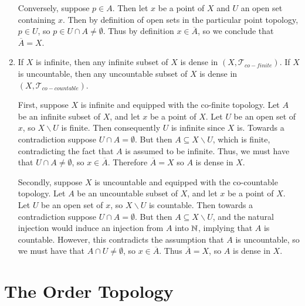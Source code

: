 \documentclass[12pt, a4paper, twoside, openright, titlepage]{book}
\begin{document}
\begin{eg}{}{}
\begin{enumerate}
\begin{proof*}{}{}
                Conversely, suppose $p \in A$. Then let $x$ be a point of $X$ and $U$ an open set containing $x$. Then by definition of open sets in the particular point topology, $p \in U$, so $p \in U \cap A \neq \emptyset$. Thus by definition $x \in \overline{A}$, so we conclude that $\overline{A} = X$.
        \end{proof*}
        \item If $X$ is infinite, then any infinite subset of $X$ is dense in $(X,\mathcal{T}_{co-finite})$. If $X$ is uncountable, then any uncountable subset of $X$ is dense in $(X,\mathcal{T}_{co-countable})$.
            \begin{proof*}{}{}
                First, suppose $X$ is infinite and equipped with the co-finite topology. Let $A$ be an infinite subset of $X$, and let $x$ be a point of $X$. Let $U$ be an open set of $x$, so $X\backslash U$ is finite. Then consequently $U$ is infinite since $X$ is. Towards a contradiction suppose $U\cap A = \emptyset$. But then $A \subseteq X\backslash U$, which is finite, contradicting the fact that $A$ is assumed to be infinite. Thus, we must have that $U\cap A \neq \emptyset$, so $x \in \overline{A}$. Therefore $\overline{A} = X$ so $A$ is dense in $X$.
                

                Secondly, suppose $X$ is uncountable and equipped with the co-countable topology. Let $A$ be an uncountable subset of $X$, and let $x$ be a point of $X$. Let $U$ be an open set of $x$, so $X\backslash U$ is countable. Then towards a contradiction suppose $U\cap A = \emptyset$. But then $A \subseteq X\backslash U$, and the natural injection would induce an injection from $A$ into $\mathbb N$, implying that $A$ is countable. However, this contradicts the assumption that $A$ is uncountable, so we must have that $A\cap U \neq \emptyset$, so $x \in \overline{A}$. Thus $\overline{A} = X$, so $A$ is dense in $X$.
            \end{proof*}
    \end{enumerate}
\end{eg}




\section{The Order Topology}
\end{document}

